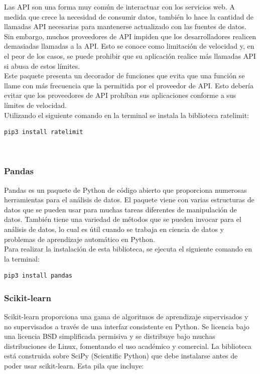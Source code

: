 {{\noindent Las API son una forma muy común de interactuar con los servicios web. A medida que crece la necesidad de consumir datos, también lo hace la cantidad de llamadas API necesarias para mantenerse actualizado con las fuentes de datos. Sin embargo, muchos proveedores de API impiden que los desarrolladores realicen demasiadas llamadas a la API. Esto se conoce como limitación de velocidad y, en el peor de los casos, se puede prohibir que su aplicación realice más llamadas API si abusa de estos límites.\\

\noindent Este paquete presenta un decorador de funciones que evita que una función se llame con más frecuencia que la permitida por el proveedor de API. Esto debería evitar que los proveedores de API prohíban sus aplicaciones conforme a sus límites de velocidad.\\

\noindent Utilizando el siguiente comando en la terminal se instala la biblioteca ratelimit:

\begin{lstlisting}
pip3 install ratelimit
\end{lstlisting}
}
\\
\subsubsection{Pandas}

\noindent Pandas es un paquete de Python de código abierto que proporciona numerosas herramientas para el análisis de datos. El paquete viene con varias estructuras de datos que se pueden usar para muchas tareas diferentes de manipulación de datos. También tiene una variedad de métodos que se pueden invocar para el análisis de datos, lo cual es útil cuando se trabaja en ciencia de datos y problemas de aprendizaje automático en Python.\\

Para realizar la instalación de esta biblioteca, se ejecuta el siguiente comando en la terminal:\\

\begin{lstlisting}
pip3 install pandas
\end{lstlisting}

\subsubsection{Scikit-learn}

\noindent Scikit-learn proporciona una gama de algoritmos de aprendizaje supervisados ​​y no supervisados ​​a través de una interfaz consistente en Python.
Se licencia bajo una licencia BSD simplificada permisiva y se distribuye bajo muchas distribuciones de Linux, fomentando el uso académico y comercial.
La biblioteca está construida sobre SciPy (Scientific Python) que debe instalarse antes de poder usar scikit-learn. Esta pila que incluye:

}
